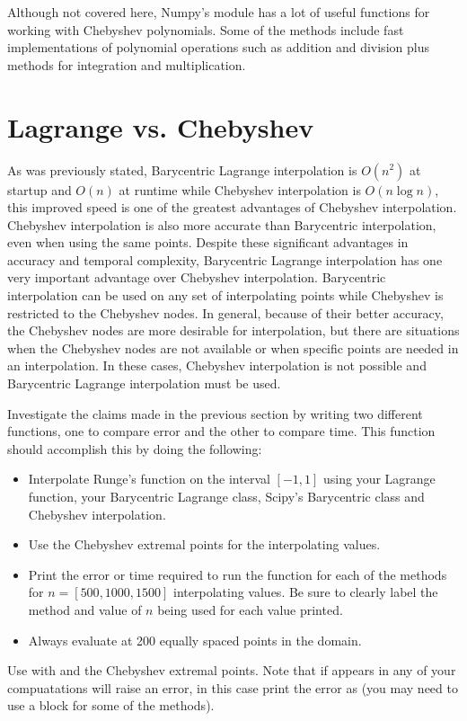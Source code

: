 Although not covered here, Numpy's  module has a lot of useful functions for working with Chebyshev polynomials.
Some of the methods include fast implementations of polynomial operations such as addition and division plus methods for integration and multiplication.

\section*{Lagrange vs. Chebyshev}
As was previously stated, Barycentric Lagrange interpolation is $O(n^2)$ at startup and $O(n)$ at runtime while Chebyshev interpolation is $O(n\log n)$, this improved speed is one of the greatest
advantages of Chebyshev interpolation.
Chebyshev interpolation is also more accurate than Barycentric interpolation, even when using the same points.
Despite these significant advantages in accuracy and temporal complexity, Barycentric Lagrange interpolation has one very important advantage over Chebyshev interpolation.
Barycentric interpolation can be used on any set of interpolating points while Chebyshev is restricted to the Chebyshev nodes.
In general, because of their better accuracy, the Chebyshev nodes are more desirable for interpolation, but there are situations when the Chebyshev nodes are not available or when specific 
points are needed in an interpolation.
In these cases, Chebyshev interpolation is not possible and Barycentric Lagrange interpolation must be used.

\begin{problem}
Investigate the claims made in the previous section by writing two different functions, one to compare error and the other to compare time.
This function should accomplish this by doing the following:
\begin{itemize}
\item Interpolate Runge's function on the interval $[-1,1]$ using your Lagrange function, your Barycentric Lagrange class, Scipy's Barycentric class and Chebyshev interpolation.
\item Use the Chebyshev extremal points for the interpolating values.
\item Print the error or time required to run the function for each of the methods for $n=[500,1000,1500]$ interpolating values.
Be sure to clearly label the method and value of $n$ being used for each value printed.
\item Always evaluate at 200 equally spaced points in the domain.
\end{itemize}
Use  with  and the Chebyshev extremal points.
Note that if  appears in any of your compuatations  will raise an error, in this case print the error as  (you may need to use a   block for some of the methods).
\end{problem}


